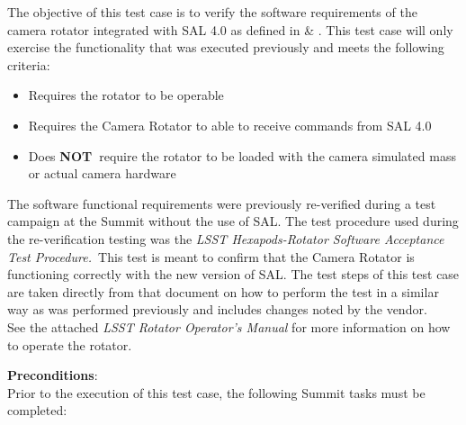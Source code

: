 \documentclass[SE,lsstdraft,STR,toc]{lsstdoc}
\providecommand{\tightlist}{
  \setlength{\itemsep}{0pt}\setlength{\parskip}{0pt}}
\begin{document}
The objective of this test case is to verify the software requirements
of the camera rotator integrated with SAL 4.0 as defined in  \&
. This test case will only exercise the functionality that was
executed previously and meets the following criteria:

\begin{itemize}
\tightlist
\item
  Requires the rotator to be operable
\item
  Requires the Camera Rotator to able to receive commands from SAL 4.0
\item
  Does \textbf{NOT~}require the rotator to be loaded with the camera
  simulated mass or actual camera hardware
\end{itemize}

The software functional requirements were previously re-verified during
a test campaign at the Summit without the use of SAL. The test procedure
used during the re-verification testing was the \emph{LSST
Hexapods-Rotator Software Acceptance Test Procedure.~}This test is meant
to confirm that the Camera Rotator is functioning correctly with the new
version of SAL. The test steps of this test case are taken directly from
that document on how to perform the test in a similar way as was
performed previously and includes changes noted by the
vendor.\\[2\baselineskip]See the attached \emph{LSST Rotator Operator's
Manual} for more information on how to operate the rotator.


\textbf{ Preconditions}:\\
Prior to the execution of this test case, the following Summit tasks
must be completed:
\end{document}
